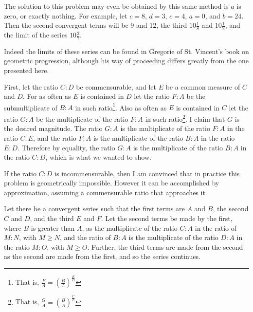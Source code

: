 \documentclass[11pt,letterpaper]{book}
\begin{document}
The solution to this problem may even be obtained by this same method is $a$ is
zero, or exactly nothing. For example, let $c = 8$, $d = 3$, $e = 4$, $a = 0$,
and $b = 24$. Then the second convergent terms will be $9$ and $12$, the third
$10\frac{1}{8}$ and $10\frac{1}{2}$, and the limit of the series
$10\frac{2}{7}$.

Indeed the limits of these series can be found in Gregorie of St. Vincent's book
on geometric progression, although his way of proceeding differs greatly from
the one presented here.

\newpage
{}

First, let the ratio $C:D$ be commensurable, and let $E$ be a common measure of
$C$ and $D$. For as often as $E$ is contained in $D$ let the ratio $F:A$ be the
submultiplicate of $B:A$ in such ratio\footnote{That is, $\frac{F}{A} =
\left(\frac{B}{A}\right)^{\frac{E}{D}}$}. Also as often as $E$ is contained in
$C$ let the ratio $G:A$ be the multiplicate of the ratio $F:A$ in such
ratio\footnote{That is, $\frac{G}{A} = \left(\frac{B}{A}\right)^{\frac{C}{E}}$}.
I claim that $G$ is the desired magnitude. The ratio $G:A$ is the multiplicate
of the ratio $F:A$ in the ratio $C:E$, and the ratio $F:A$ is the multiplicate
of the ratio $B:A$ in the ratio $E:D$. Therefore by equality, the ratio $G:A$ is
the multiplicate of the ratio $B:A$ in the ratio $C:D$, which is what we wanted
to show.

If the ratio $C:D$ is incommensurable, then I am convinced that in practice this
problem is geometrically impossible. However it can be accomplished by
approximation, assuming a commensurable ratio that approaches it.

Let there be a convergent series such that the first terms are $A$ and $B$, the
second $C$ and $D$, and the third $E$ and $F$. Let the second terms be made
by the first, where $B$ is greater than $A$, as the multiplicate of the ratio
$C:A$ in the ratio of $M:N$, with $M\geq N$, and the ratio of $B:A$ is the
multiplicate of the ratio $D:A$ in the ratio $M:O$, with $M\geq O$. Further, the
third terms are made from the second as the second are made from the first, and
so the series continues.
\end{document}

